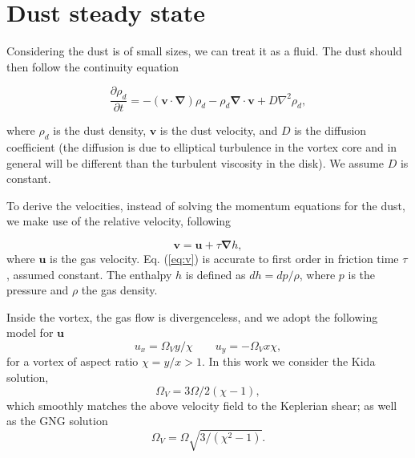 \documentclass[apj]{emulateapj}
\newcommand{\pderiv}[2]{\frac{\partial #1}{\partial #2}}
\renewcommand{\v}[1]{{\boldsymbol{#1}}} %
\newcommand{\del}{\v{\nabla}}
\newcommand{\grad}{\del}
\newcommand{\Div}{\del\cdot}
\newcommand{\Laplace}{\nabla^2}
\newcommand{\Eq}[1]{Eq. (\ref{#1})}
\newcommand{\eq}[1]{\Eq{#1}}
\newcommand{\beq}{\begin{equation}}
\newcommand{\eeq}{\end{equation}}
\begin{document}




\section{Dust steady state} 
\label{sect:model-equations}

Considering the dust is of small sizes, we can treat it as a
fluid. The dust should then follow the continuity equation 

\beq
  \pderiv{\rho_d}{t} = -(\v{v}\cdot\del)\rho_d - \rho_d \Div{\v{v}} + D\Laplace{\rho_d},
  \label{eq:continuity}
\eeq

\noindent where $\rho_d$ is the dust density, $\v{v}$ is the dust
velocity, and $D$ is the diffusion coefficient (the diffusion is due
to elliptical turbulence in the vortex core and in general will be
different than the turbulent viscosity in the disk). We assume $D$ is
constant. 

To derive the velocities, instead of solving the momentum equations
for the dust, we make use of the relative velocity, following
\citet[see also \citealt{Youdin08}]{Youdin-Goodman05}

\beq
\v{v} = \v{u} + \tau  \grad{h}, 
\label{eq:v}
\eeq
\noindent where $\v{u}$ is the gas velocity. \eq{eq:v} is 
accurate to first order in friction time $\tau$, assumed 
constant. The enthalpy $h$ is defined as $dh = dp /\rho$, where $p$ 
is the pressure and $\rho$ the gas density. 

Inside the vortex, the gas flow is divergenceless, and 
we adopt the following model for $\v{u}$
\beq
  u_x = \varOmega_V y / \chi \qquad  u_y= -\varOmega_V x \chi,
  \label{eq:vortex}
\eeq
\noindent for a vortex of aspect ratio $\chi= y/x > 1$. In this work
we consider the Kida solution,
\beq
\varOmega_V = 3\varOmega/2(\chi-1),  
\eeq
which smoothly matches the above velocity field to the Keplerian
shear; as well as the GNG solution
\beq
\varOmega_V=\varOmega\sqrt{3/(\chi^2-1)}.
\eeq
\end{document}
